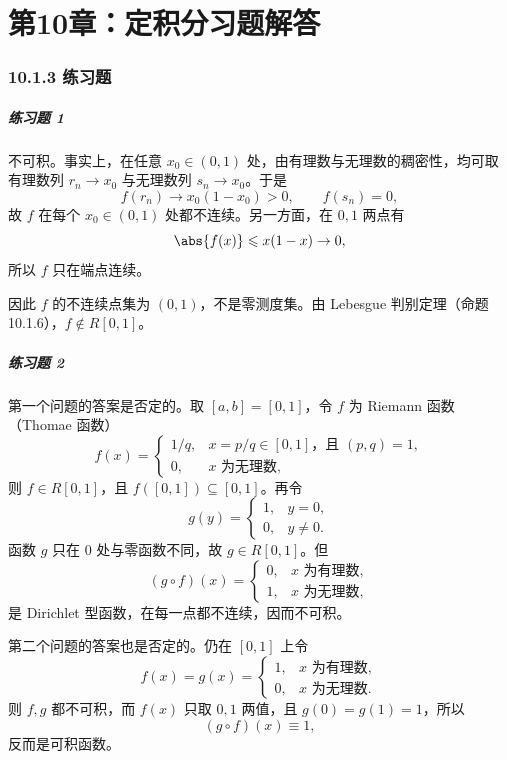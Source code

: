 
\chapter*{第10章：定积分习题解答}
\subsection*{10.1.3 练习题}

\paragraph{练习题 1}
\begin{xsolution}
不可积。事实上，在任意 $x_0\in(0,1)$ 处，由有理数与无理数的稠密性，均可取有理数列 $r_n\to x_0$ 与无理数列 $s_n\to x_0$。于是
\[
  f(r_n)\to x_0(1-x_0)>0,
  \qquad
  f(s_n)=0,
\]
故 $f$ 在每个 $x_0\in(0,1)$ 处都不连续。另一方面，在 $0,1$ 两点有
\[
  \abs{f(x)}\leqslant x(1-x)\to0,
\]
所以 $f$ 只在端点连续。

因此 $f$ 的不连续点集为 $(0,1)$，不是零测度集。由 Lebesgue 判别定理（命题 10.1.6），$f\notin R[0,1]$。
\end{xsolution}

\paragraph{练习题 2}
\begin{xsolution}
第一个问题的答案是否定的。取 $[a,b]=[0,1]$，令 $f$ 为 Riemann 函数（Thomae 函数）
\[
  f(x)=
  \begin{cases}
    1/q,&x=p/q\in[0,1]\text{，且 }(p,q)=1,\\
    0,&x\text{ 为无理数},
  \end{cases}
\]
则 $f\in R[0,1]$，且 $f([0,1])\subseteq[0,1]$。再令
\[
  g(y)=
  \begin{cases}
    1,&y=0,\\
    0,&y\ne0.
  \end{cases}
\]
函数 $g$ 只在 $0$ 处与零函数不同，故 $g\in R[0,1]$。但
\[
  (g\circ f)(x)=
  \begin{cases}
    0,&x\text{ 为有理数},\\
    1,&x\text{ 为无理数},
  \end{cases}
\]
是 Dirichlet 型函数，在每一点都不连续，因而不可积。

第二个问题的答案也是否定的。仍在 $[0,1]$ 上令
\[
  f(x)=g(x)=
  \begin{cases}
    1,&x\text{ 为有理数},\\
    0,&x\text{ 为无理数}.
  \end{cases}
\]
则 $f,g$ 都不可积，而 $f(x)$ 只取 $0,1$ 两值，且 $g(0)=g(1)=1$，所以
\[
  (g\circ f)(x)\equiv1,
\]
反而是可积函数。
\end{xsolution}


